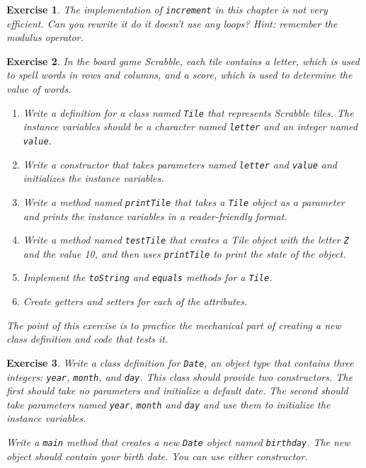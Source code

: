 \documentclass[12pt]{book}
\theoremstyle{exercise}
\newtheorem{exercise}{Exercise}[chapter]
\newcommand{\java}[1]{\verb"#1"}
\newcommand{\java}[1]{\lstinline{#1}} %
\begin{document}
\begin{exercise}
The implementation of \java{increment} in this chapter is not very efficient.
Can you rewrite it do it doesn't use any loops?
Hint: remember the modulus operator.

\end{exercise}


\begin{exercise}
In the board game Scrabble, each tile contains a letter, which is used to spell words in rows and columns, and a score, which is used to determine the value of words.

\begin{enumerate}

\item Write a definition for a class named \java{Tile} that represents Scrabble tiles.
The instance variables should be a character named \java{letter} and an integer named \java{value}.

\item Write a constructor that takes parameters named \java{letter} and \java{value} and initializes the instance variables.

\item Write a method named \java{printTile} that takes a \java{Tile} object as a parameter and prints the instance variables in a reader-friendly format.

\item Write a method named \java{testTile} that creates a Tile object with the letter \java{Z} and the value 10, and then uses \java{printTile} to print the state of the object.

\item Implement the \java{toString} and \java{equals} methods for a \java{Tile}.

\item Create getters and setters for each of the attributes.

\end{enumerate}

The point of this exercise is to practice the mechanical part of creating a new class definition and code that tests it.
\end{exercise}


\begin{exercise}
Write a class definition for \java{Date}, an object type that contains three integers: \java{year}, \java{month}, and \java{day}.
This class should provide two constructors.
The first should take no parameters and initialize a default date.
The second should take parameters named \java{year}, \java{month} and \java{day} and use them to initialize the instance variables.

Write a \java{main} method that creates a new \java{Date} object named \java{birthday}.
The new object should contain your birth date.
You can use either constructor.
\end{exercise}
\end{document}
